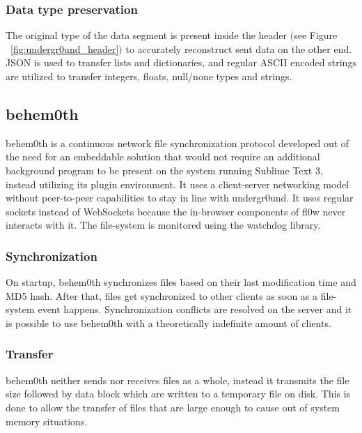 \documentclass[conference]{IEEEtran}
\begin{document}
\subsubsection{Data type preservation}
The original type of the data segment is present inside the header $($see Figure ~\ref{fig:undergr0und_header}$)$ to accurately reconstruct sent data on the other end. JSON\cite{JSON:T. Bray Ed.} is used to transfer lists and dictionaries, and regular ASCII encoded strings are utilized to transfer integers, floats, null/none types and strings.

\subsection{behem0th}
behem0th is a continuous network file synchronization protocol developed out of the need for an embeddable solution that would not require an additional background program to be present on the system running Sublime Text 3\cite{Sublime Text 3:Sublime HQ}, instead utilizing its plugin environment. It uses a client-server networking model without peer-to-peer capabilities to stay in line with undergr0und. It uses regular sockets instead of WebSockets\cite{The WebSocket Protocol:A. Melnikov} because the in-browser components of fl0w never interacts with it. The file-system is monitored using the watchdog\cite{watchdog:Yesudeep Mangalapilly} library.\\

\subsubsection{Synchronization}
On startup, behem0th synchronizes files based on their last modification time and MD5 hash. After that, files get synchronized to other clients as soon as a file-system event happens. Synchronization conflicts are resolved on the server and it is possible to use behem0th with a theoretically indefinite amount of clients.\\

\subsubsection{Transfer}
behem0th neither sends nor receives files as a whole, instead it transmits the file size followed by data block which are written to a temporary file on disk. This is done to allow the transfer of files that are large enough to cause out of system memory situations.\\
\end{document}
